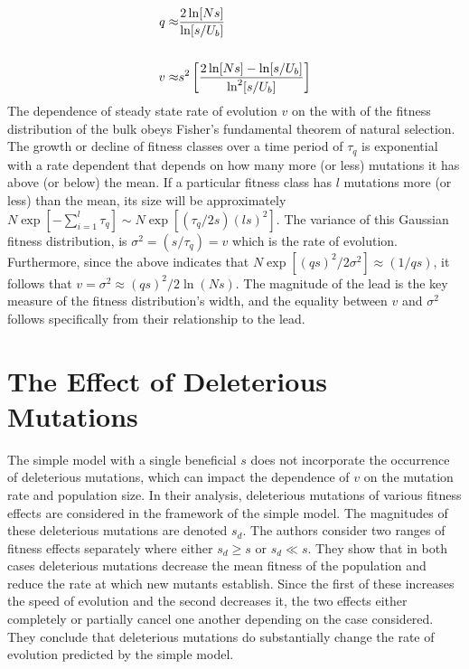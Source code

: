 \documentclass[12pt, one column]{article}
\begin{document}
\begin{equation}
\begin{aligned}
q \approx & {2\ln[Ns] \over \ln[s/U_b]} \\   
\\
v \approx & s^2 \left[{2\ln[Ns] - \ln[s/U_b] \over \ln^2[s/U_b]}\right]
\end{aligned}
\end{equation} 
The dependence of steady state rate of evolution $v$ on the with of the fitness distribution of the bulk obeys Fisher's fundamental theorem of natural selection.  The growth or decline of fitness classes over a time period of $\tau_q$ is exponential with a rate dependent that depends on how many more (or less) mutations it has above (or below) the mean.  If a particular fitness class has $l$ mutations  more (or less) than the mean, its size will be approximately $N \exp[-\sum_{i=1}^{l} \tau_q] \sim N \exp[(\tau_q/2s)(ls)^2]$.  The variance of this Gaussian fitness distribution, is $\sigma^2 = (s/\tau_q)=v$ which is the rate of evolution.  Furthermore, since the above indicates that $N \exp[(qs)^2/2\sigma^2]\approx (1/qs)$, it follows that $v=\sigma^2 \approx (qs)^2/2\ln(Ns)$.  The magnitude of the lead is the key measure of the fitness distribution's width, and the equality between $v$ and $\sigma^2$ follows specifically from their relationship to the lead.

\section*{The Effect of Deleterious Mutations}
The simple model with a single beneficial $s$ does not incorporate the occurrence of deleterious mutations, which can impact the dependence of $v$ on the mutation rate and population size.  In their analysis, deleterious mutations of various fitness effects are considered in the framework of the simple model.  The magnitudes of these deleterious mutations are denoted $s_d$.  The authors consider two ranges of fitness effects separately where either $s_d \geq s$ or $s_d \ll s$.  They show that in both cases deleterious mutations decrease the mean fitness of the population and reduce the rate at which new mutants establish.  Since the first of these increases the speed of evolution and the second decreases it, the two effects either completely or partially cancel one another depending on the case considered.  They conclude that deleterious mutations do substantially change the rate of evolution predicted by the simple model.     
\end{document}
